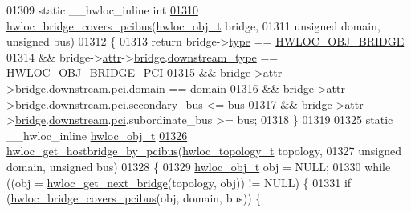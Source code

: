 \begin{DoxyCode}
{{01309 \textcolor{keyword}{static} \_\_hwloc\_inline \textcolor{keywordtype}{int}
\hypertarget{a00031_source_l01310}{}\hyperlink{a00064_gaef22d6bf5cb0b7f13a863780126a8cb7}{01310} \hyperlink{a00064_gaef22d6bf5cb0b7f13a863780126a8cb7}{hwloc_bridge_covers_pcibus}(\hyperlink{a00016}{hwloc_obj_t} bridge,
01311                            \textcolor{keywordtype}{unsigned} domain, \textcolor{keywordtype}{unsigned} bus)
01312 \{
01313   \textcolor{keywordflow}{return} bridge->\hyperlink{a00016_acc4f0803f244867e68fe0036800be5de}{type} == \hyperlink{a00041_ggacd37bb612667dc437d66bfb175a8dc55a6825f10895fea60aca7a6ba9fe273db0}{HWLOC_OBJ_BRIDGE}
01314     && bridge->\hyperlink{a00016_accd40e29f71f19e88db62ea3df02adc8}{attr}->\hyperlink{a00017_adbdf280699dd84c7619cd8d9edc0d958}{bridge}.\hyperlink{a00012_ac6a169b672d0e9f75756fd5665828b93}{downstream_type} == \hyperlink{a00041_gga48a4803c72574191d7ead1c62aaf9860a8f3b4cecf3dab6073d74696d10863c60}{HWLOC_OBJ_BRIDGE_PCI}
01315     && bridge->\hyperlink{a00016_accd40e29f71f19e88db62ea3df02adc8}{attr}->\hyperlink{a00017_adbdf280699dd84c7619cd8d9edc0d958}{bridge}.\hyperlink{a00012_acaf1ae02e37182bbb6966f8c4f35e499}{downstream}.\hyperlink{a00012_ab5c564e7c95b747dae9eb84ec0a2c31e}{pci}.domain == domain
01316     && bridge->\hyperlink{a00016_accd40e29f71f19e88db62ea3df02adc8}{attr}->\hyperlink{a00017_adbdf280699dd84c7619cd8d9edc0d958}{bridge}.\hyperlink{a00012_acaf1ae02e37182bbb6966f8c4f35e499}{downstream}.\hyperlink{a00012_ab5c564e7c95b747dae9eb84ec0a2c31e}{pci}.secondary\_bus <= bus
01317     && bridge->\hyperlink{a00016_accd40e29f71f19e88db62ea3df02adc8}{attr}->\hyperlink{a00017_adbdf280699dd84c7619cd8d9edc0d958}{bridge}.\hyperlink{a00012_acaf1ae02e37182bbb6966f8c4f35e499}{downstream}.\hyperlink{a00012_ab5c564e7c95b747dae9eb84ec0a2c31e}{pci}.subordinate\_bus >= bus;
01318 \}
01319 
01325 \textcolor{keyword}{static} \_\_hwloc\_inline \hyperlink{a00016}{hwloc_obj_t}
\hypertarget{a00031_source_l01326}{}\hyperlink{a00064_ga81d4f68afbd68d94eb70d4f5c603eff5}{01326} \hyperlink{a00064_ga81d4f68afbd68d94eb70d4f5c603eff5}{hwloc_get_hostbridge_by_pcibus}(\hyperlink{a00039_ga9d1e76ee15a7dee158b786c30b6a6e38}{hwloc_topology_t} topology,
01327                                \textcolor{keywordtype}{unsigned} domain, \textcolor{keywordtype}{unsigned} bus)
01328 \{
01329   \hyperlink{a00016}{hwloc_obj_t} obj = NULL;
01330   \textcolor{keywordflow}{while} ((obj = \hyperlink{a00064_ga2bd3f856d0fc3c6c02642c17d763b823}{hwloc_get_next_bridge}(topology, obj)) != NULL) \{
01331     \textcolor{keywordflow}{if} (\hyperlink{a00064_gaef22d6bf5cb0b7f13a863780126a8cb7}{hwloc_bridge_covers_pcibus}(obj, domain, bus)) \{
}}
\end{DoxyCode}
